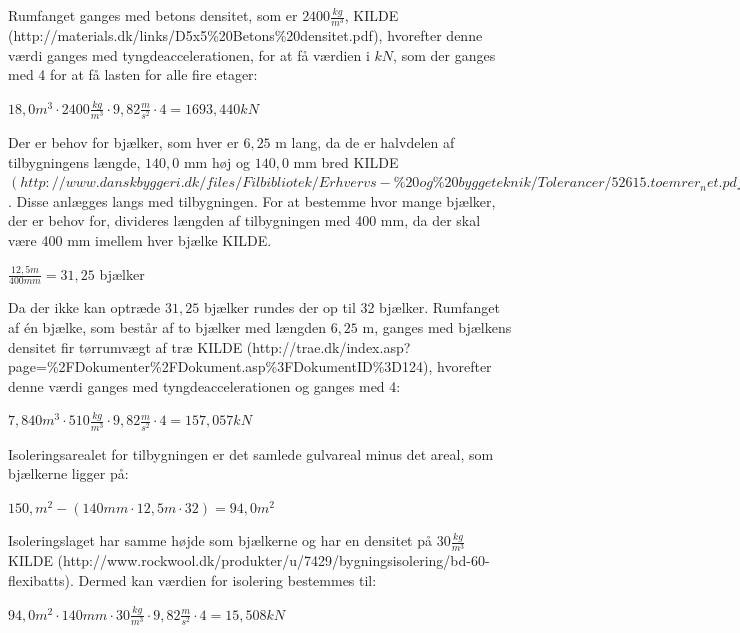 Rumfanget ganges med betons densitet, som er $2400 \frac{kg}{m^3}$, KILDE (http://materials.dk/links/D5x5\%20Betons\%20densitet.pdf), hvorefter denne værdi ganges med tyngdeaccelerationen, for at få værdien i $kN$, som der ganges med 4 for at få lasten for alle fire etager:
\begin{center}
	$18,\!0 m^3\cdot 2400 \frac{kg}{m^3}\cdot 9,82 \frac{m}{s^2}\cdot 4=1693,440 kN$
\end{center}

Der er behov for bjælker, som hver er $6,\!25$ m lang, da de er halvdelen af tilbygningens længde, $140,\!0$ mm høj og $140,\!0$ mm bred KILDE $(http://www.danskbyggeri.dk/files/Filbibliotek/Erhvervs-\%20og\%20byggeteknik/Tolerancer/52615.toemrer_net.pdf)$. Disse anlægges langs med tilbygningen. For at bestemme hvor mange bjælker, der er behov for, divideres længden af tilbygningen med 400 mm, da der skal være 400 mm imellem hver bjælke KILDE.
\begin{center}
	$\frac{12,\!5 m}{400 mm}=31,\!25$ bjælker
\end{center} 

Da der ikke kan optræde $31,\!25$ bjælker rundes der op til 32 bjælker.
\newline
\newline
Rumfanget af én bjælke, som består af to bjælker med længden $6,\!25$ m, ganges med bjælkens densitet fir tørrumvægt af træ KILDE (http://trae.dk/index.asp?page=\%2FDokumenter\%2FDokument.asp\%3FDokumentID\%3D124), hvorefter denne værdi ganges med tyngdeaccelerationen og ganges med 4: 
\begin{center}
	$7,\!840 m^3\cdot 510 \frac{kg}{m^3}\cdot 9,\!82 \frac{m}{s^2}\cdot 4=157,\!057 kN$
\end{center}

Isoleringsarealet for tilbygningen er det samlede gulvareal minus det areal, som bjælkerne ligger på:
\begin{center}
	$150,\! m^2 - (140 mm\cdot 12,\!5 m\cdot 32)=94,\!0 m^2$
\end{center}

Isoleringslaget har samme højde som bjælkerne og har en densitet på $30 \frac{kg}{m^3}$ KILDE (http://www.rockwool.dk/produkter/u/7429/bygningsisolering/bd-60-flexibatts). Dermed kan værdien for isolering bestemmes til:
\begin{center}
	$94,\!0 m^2\cdot 140 mm\cdot 30 \frac{kg}{m^3}\cdot 9,\!82 \frac{m}{s^2}\cdot 4=15,\!508 kN$
\end{center}

